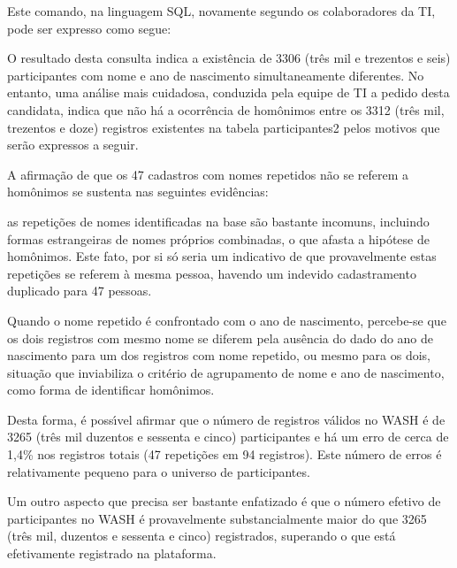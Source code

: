 \documentclass[
12pt,		%
openright,	%
twoside,  %
a4paper,			%
chapter=TITLE,		%
english,			%
french,				%
spanish,			%
brazil				%
]{USPSC-classe/USPSC}
\begin{document}
Este comando, na linguagem SQL, novamente segundo os colaboradores da TI, pode ser expresso como segue:



\noindent\begin{center}\mbox{\centering{}}\end{center}


O resultado desta consulta indica a exist\^encia de 3306 (tr\^es mil e trezentos e seis) participantes com nome e ano de nascimento simultaneamente diferentes. No entanto, uma an\'alise mais cuidadosa, conduzida pela equipe de TI a pedido desta candidata, indica que n\~ao h\'a a ocorr\^encia de hom\^onimos entre os 3312 (tr\^es mil, trezentos e doze) registros existentes na tabela  participantes2 pelos motivos que ser\~ao expressos a seguir.


A afirma\c{c}\~ao de que os 47 cadastros com nomes repetidos n\~ao se referem a hom\^onimos se sustenta nas seguintes evid\^encias:



\begin{alineas}
\item as repeti\c{c}\~oes de nomes identificadas na base s\~ao bastante incomuns, incluindo formas estrangeiras de nomes pr\'oprios combinadas, o que afasta a hip\'otese de hom\^onimos. Este fato, por si s\'o seria um indicativo de que provavelmente estas repeti\c{c}\~oes se referem \`a mesma pessoa, havendo um indevido cadastramento duplicado para 47 pessoas.
\item Quando o nome repetido \'e confrontado com o ano de nascimento, percebe-se que os dois registros com mesmo nome se diferem pela aus\^encia do dado do ano de nascimento para um dos registros com nome repetido, ou mesmo para os dois, situa\c{c}\~ao que inviabiliza o crit\'erio de agrupamento de nome e ano de nascimento, como forma de identificar hom\^onimos.
\end{alineas}

Desta forma, \'e poss\'{\i}vel afirmar que o n\'umero de registros v\'alidos no WASH \'e de 3265 (tr\^es mil duzentos e sessenta e cinco) participantes e h\'a um erro de cerca de 1,4\% nos registros totais (47 repeti\c{c}\~oes em 94 registros). Este n\'umero de erros \'e relativamente pequeno para o universo de participantes.


Um outro aspecto que precisa ser bastante enfatizado \'e que o n\'umero efetivo de participantes no WASH \'e provavelmente substancialmente maior do que 3265 (tr\^es mil, duzentos e sessenta e cinco) registrados, superando o que est\'a efetivamente registrado na plataforma.
\end{document}
